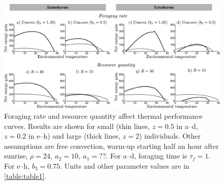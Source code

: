 \clearpage

\begin{figure}
\includegraphics[width=\textwidth]{fig5}
\caption{
    \setstretch{\stretchby}
	Foraging rate and resource quantity affect thermal performance curves.
	Results are shown for small (thin lines, $z = 0.5$ in a--d, $z = 0.2$ in e--h) and large (thick lines, $z = 2$) individuals.
	Other assumptions are free convection, warm-up starting half an hour after sunrise, $\rho = 24,\ a_2 = 10,\ a_1 = ??$. %
    For a--d, foraging time is $\tau_f = 1$.
    For e--h, $b_3 = 0.75$.
    Units and other parameter values are in \cref{table:table1}.
}
\label{fig5}
\end{figure}
